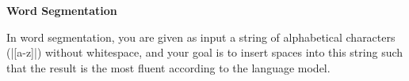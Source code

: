 \item {\bf Word Segmentation}

In word segmentation, you are given as input a string of alphabetical characters
(|[a-z]|) without whitespace, and your goal is to insert spaces into this
string such that the result is the most fluent according to the language model.

\begin{enumerate}

  

  

\end{enumerate}
